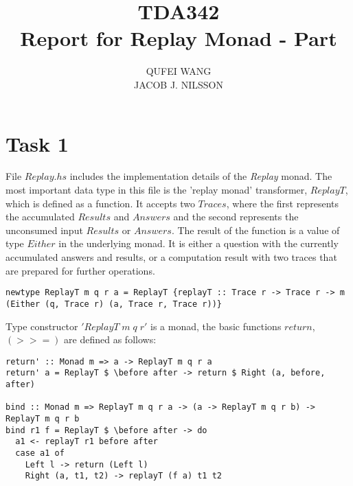 \documentclass[10pt]{article}
\title{TDA342\\ Report for Replay Monad - Part \RomanNumeralCaps 1}
\author{QUFEI WANG \\ JACOB J. NILSSON}
\begin{document}
\maketitle
\section*{Task 1}
File $Replay.hs$ includes the implementation details of the \textit{Replay} monad. The most important data type in this file is the 'replay monad' transformer, $ReplayT$, which is defined as a function. It accepts two $Traces$, where the first represents the accumulated $Results$ and $Answers$ and the second represents the unconsumed input $Results$ or $Answers$. The result of the function is a value of type $Either$ in the underlying monad. It is either a question with the currently accumulated answers and results, or a computation result with two traces that are prepared for further operations. 
\begin{lstlisting}
newtype ReplayT m q r a = ReplayT {replayT :: Trace r -> Trace r -> m (Either (q, Trace r) (a, Trace r, Trace r))}
\end{lstlisting}

Type constructor $'ReplayT\; m\; q\; r'$ is a monad, the basic functions $return$, $(>>=)$ are defined as follows:
\begin{lstlisting}
return' :: Monad m => a -> ReplayT m q r a                                                                                                                                                    
return' a = ReplayT $ \before after -> return $ Right (a, before, after)

bind :: Monad m => ReplayT m q r a -> (a -> ReplayT m q r b) -> ReplayT m q r b                                                                                                               
bind r1 f = ReplayT $ \before after -> do                                                                                                                                                     
  a1 <- replayT r1 before after                                                                                                                                                               
  case a1 of                                                                                                                                                                                  
    Left l -> return (Left l)                                                                                                                                                                 
    Right (a, t1, t2) -> replayT (f a) t1 t2
\end{lstlisting} 
\end{document}

